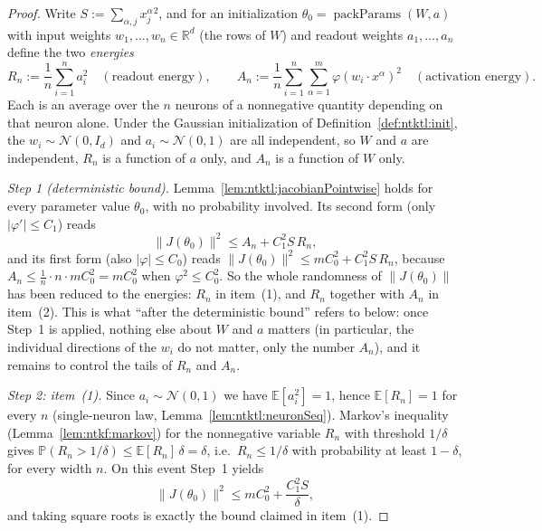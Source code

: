 \begin{proof}
  \leanok
Write $S:=\sum_{\alpha,j}x^\alpha_j{}^2$, and for an initialization $\theta_0=\operatorname{packParams}(W,a)$ with input weights $w_1,\dots,w_n\in\mathbb R^d$ (the rows of $W$) and readout weights $a_1,\dots,a_n$ define the two \emph{energies}
\[
  R_n:=\frac1n\sum_{i=1}^na_i^2\quad(\text{readout energy}),\qquad
  A_n:=\frac1n\sum_{i=1}^n\sum_{\alpha=1}^m\varphi(w_i\cdot x^\alpha)^2\quad(\text{activation energy}).
\]
Each is an average over the $n$ neurons of a nonnegative quantity depending on that neuron alone. Under the Gaussian initialization of Definition~\ref{def:ntktl:init}, the $w_i\sim\mathcal N(0,I_d)$ and $a_i\sim\mathcal N(0,1)$ are all independent, so $W$ and $a$ are independent, $R_n$ is a function of $a$ only, and $A_n$ is a function of $W$ only.

\emph{Step 1 (deterministic bound).} Lemma~\ref{lem:ntktl:jacobianPointwise} holds for every parameter value $\theta_0$, with no probability involved. Its second form (only $|\varphi'|\le C_1$) reads
\[
  \|J(\theta_0)\|^2\le A_n+C_1^2S\,R_n,
\]
and its first form (also $|\varphi|\le C_0$) reads $\|J(\theta_0)\|^2\le mC_0^2+C_1^2S\,R_n$, because $A_n\le\frac1n\cdot n\cdot mC_0^2=mC_0^2$ when $\varphi^2\le C_0^2$. So the whole randomness of $\|J(\theta_0)\|$ has been reduced to the energies: $R_n$ in item~(1), and $R_n$ together with $A_n$ in item~(2). This is what ``after the deterministic bound'' refers to below: once Step~1 is applied, nothing else about $W$ and $a$ matters (in particular, the individual directions of the $w_i$ do not matter, only the number $A_n$), and it remains to control the tails of $R_n$ and $A_n$.

\emph{Step 2: item~(1).} Since $a_i\sim\mathcal N(0,1)$ we have $\mathbb E[a_i^2]=1$, hence $\mathbb E[R_n]=1$ for every $n$ (single-neuron law, Lemma~\ref{lem:ntktl:neuronSeq}). Markov's inequality (Lemma~\ref{lem:ntkf:markov}) for the nonnegative variable $R_n$ with threshold $1/\delta$ gives $\mathbb P(R_n>1/\delta)\le\mathbb E[R_n]\,\delta=\delta$, i.e.\ $R_n\le1/\delta$ with probability at least $1-\delta$, for every width $n$. On this event Step~1 yields
\[
  \|J(\theta_0)\|^2\le mC_0^2+\frac{C_1^2S}{\delta},
\]
and taking square roots is exactly the bound claimed in item~(1).


\end{proof}
